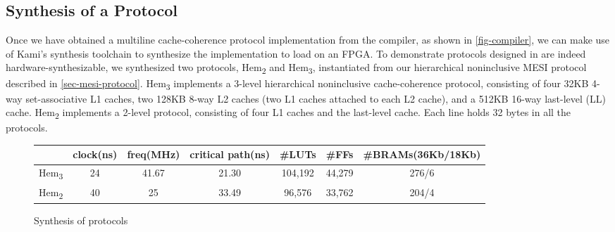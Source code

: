 \documentclass[sigplan,10pt,review,anonymous,screen]{acmart}\settopmatter{printfolios=true,printccs=false,printacmref=false}
\begin{document}
\subsection{Synthesis of a \hemiola{} Protocol}
\label{sec-synthesis-protocol}

\newcommand{\bhemh}{{\sf Hem\textsubscript{3}}}
\newcommand{\bhemt}{{\sf Hem\textsubscript{2}}}
\newcommand{\briscy}{{\sf Riscy}}

Once we have obtained a multiline cache-coherence protocol implementation from the compiler, as shown in \autoref{fig-compiler}, we can make use of Kami's synthesis toolchain to synthesize the implementation to load on an FPGA.
To demonstrate protocols designed in \hemiola{} are indeed hardware-synthesizable, we synthesized two \hemiola{} protocols, \bhemt{} and \bhemh{}, instantiated from our hierarchical noninclusive MESI protocol described in \autoref{sec-mesi-protocol}.
\bhemh{} implements a 3-level hierarchical noninclusive cache-coherence protocol, consisting of four 32KB 4-way set-associative L1 caches, two 128KB 8-way L2 caches (two L1 caches attached to each L2 cache), and a 512KB 16-way last-level (LL) cache.
\bhemt{} implements a 2-level protocol, consisting of four L1 caches and the last-level cache.
Each line holds 32 bytes in all the protocols.

\begin{figure}[h]
  \centering\footnotesize
  \begin{tabular}{|c|c|c|c|c|c|c|}
    \hline
    & clock\;(ns) & freq\;(MHz) & critical path\;(ns) & \#LUTs & \#FFs & \#BRAMs\;(36Kb/18Kb) \\
    \hline
    \bhemh{} & 24 & 41.67 & 21.30 & 104,192 & 44,279 & 276/6 \\
    \bhemt{} & 40 & 25 & 33.49 & 96,576 & 33,762 & 204/4 \\
    \hline
  \end{tabular}
  \caption{Synthesis of \hemiola{} protocols}
  \label{fig-synthesis}
\end{figure}

\end{document}
